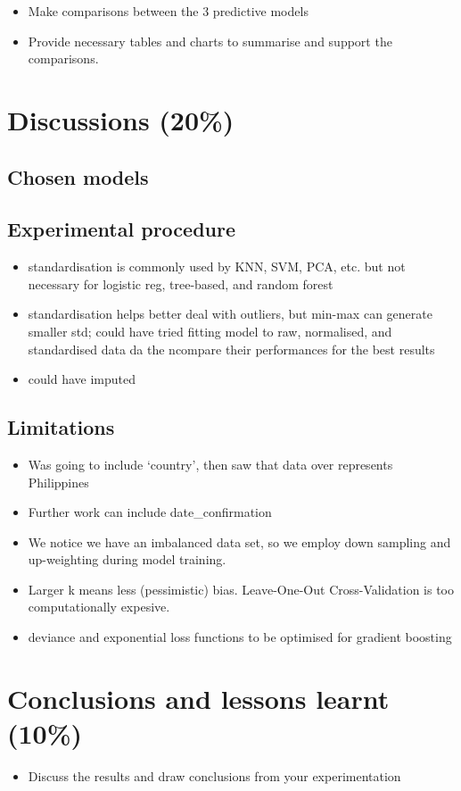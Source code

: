 \documentclass[twoside,11pt]{article}
\begin{document}
\begin{itemize}
    \item Make comparisons between the 3 predictive models
    \item Provide necessary tables and charts to summarise and support the comparisons.
\end{itemize}

\section{Discussions (20\%)}
\subsection{Chosen models}
\subsection{Experimental procedure}
\begin{itemize}
    \item standardisation is commonly used by KNN, SVM, PCA, etc. but not necessary for logistic reg, tree-based, and random forest
    \item standardisation helps better deal with outliers, but min-max can generate smaller std; could have tried fitting model to raw, normalised, and standardised data da the ncompare their performances for the best results
    \item could have imputed
\end{itemize}
\subsection{Limitations}
\begin{itemize}
    \item Was going to include `country', then saw that data over represents Philippines
    \item Further work can include date\_confirmation
    \item We notice we have an imbalanced data set, so we employ down sampling and up-weighting during model training.
    \item Larger k means less (pessimistic) bias. Leave-One-Out Cross-Validation is too computationally expesive.
    \item  deviance and exponential loss functions to be optimised for gradient boosting
\end{itemize}

\section{Conclusions and lessons learnt (10\%)}
\begin{itemize}
    \item Discuss the results and draw conclusions from your experimentation
\end{itemize}




\vskip 0.2in

\end{document}
